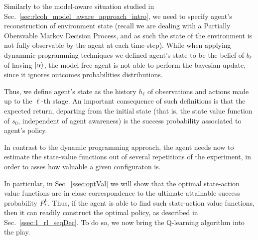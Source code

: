 Similarly to the model-aware situation studied in Sec.~\ref{sec:rlcoh_model_aware_approach_intro}, we need to specify agent's reconstruction of environment state (recall we are dealing with a Partially Obersvable Markov Decision Process, and as such the state of the environment is not fully observable by the agent at each time-step). While when applying dynammic programming techniques we defined agent's state to be the belief of $b_\ell$ of having $\ket{\alpha}$, the model-free agent is not able to perform the bayesian update, since it ignores outcomes probabilities distributions.

Thus, we define agent's state as the history $h_\ell$ of observations and actions made up to the $\ell$-th stage. An important consequence of such definitions is that the expected return, departing from the initial state (that is, the state value function of $s_0$, independent of agent awareness) is the success probability associated to agent's policy.

In contrast to the dynamic programming approach, the agent needs now to estimate the state-value functions out of several repetitions of the experiment, in order to asses how valuable a given configuraton is.

In particular, in Sec.~\ref{ssec:optVal} we will show that the optimal state-action value functions are in close correspondence to the ultimate attainable success probability $P_*^{L}$. Thus, if the agent is able to find such state-action value functions, then it can readily construct the optimal policy, as described in Sec.~\ref{ssec:1_rl_seqDec}. To do so, we now bring the Q-learning algorithm into the play.
